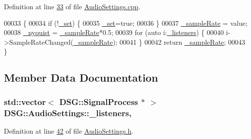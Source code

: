 Definition at line \hyperlink{_audio_settings_8cpp_source_l00033}{33} of file \hyperlink{_audio_settings_8cpp_source}{Audio\+Settings.\+cpp}.


\begin{DoxyCode}
00033                                                                                \{
00034     \textcolor{keywordflow}{if} (!\hyperlink{class_d_s_g_1_1_audio_settings_abd6bfacf2a290d84b3e20487dbf71fa3}{\_set}) \{
00035         \hyperlink{class_d_s_g_1_1_audio_settings_abd6bfacf2a290d84b3e20487dbf71fa3}{\_set}=\textcolor{keyword}{true};
00036     \}
00037     \hyperlink{class_d_s_g_1_1_audio_settings_a56869b51933f102b197f54001c8a1d27}{\_sampleRate} = value;
00038     \hyperlink{class_d_s_g_1_1_audio_settings_af3c7cbd15390d9bcbe39983c069390b5}{\_nyquist} = \hyperlink{class_d_s_g_1_1_audio_settings_a56869b51933f102b197f54001c8a1d27}{\_sampleRate}*0.5;
00039     \textcolor{keywordflow}{for} (\textcolor{keyword}{auto} i:\hyperlink{class_d_s_g_1_1_audio_settings_ab4e90df02910d9b84b0054457af5d5fa}{\_listeners}) \{
00040         i->SampleRateChanged(\hyperlink{class_d_s_g_1_1_audio_settings_a56869b51933f102b197f54001c8a1d27}{\_sampleRate});
00041     \}
00042     \textcolor{keywordflow}{return} \hyperlink{class_d_s_g_1_1_audio_settings_a56869b51933f102b197f54001c8a1d27}{\_sampleRate};
00043 \}
\end{DoxyCode}


\subsection{Member Data Documentation}
\hypertarget{class_d_s_g_1_1_audio_settings_ab4e90df02910d9b84b0054457af5d5fa}{
\subsubsection[{\+\_\+listeners}]{\setlength{\rightskip}{0pt plus 5cm}std\+::vector$<$ {\bf D\+S\+G\+::\+Signal\+Process} $\ast$ $>$ D\+S\+G\+::\+Audio\+Settings\+::\+\_\+listeners\hspace{0.3cm}{\ttfamily [static]}, {\ttfamily [protected]}}}\label{class_d_s_g_1_1_audio_settings_ab4e90df02910d9b84b0054457af5d5fa}


Definition at line \hyperlink{_audio_settings_8h_source_l00042}{42} of file \hyperlink{_audio_settings_8h_source}{Audio\+Settings.\+h}.

